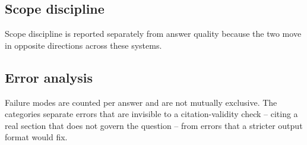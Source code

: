 \documentclass[11pt,a4paper]{article}
\begin{document}
\subsection{Scope discipline}
Scope discipline is reported separately from answer quality because the two move in opposite directions across these systems.
\begin{table}[htbp]
\centering
\renewcommand{\arraystretch}{1.15}
\caption{Scope discipline. The out-of-scope probe set contains 20 questions from other domains (income tax, VAT, criminal law, immigration, foreign labour law, medicine, programming, general knowledge); the desired behaviour is to decline. The in-scope column is the over-refusal rate on the hold-out set, where declining is a failure.}
\label{tab:refusal}
\small
{}
\end{table}

\subsection{Error analysis}
Failure modes are counted per answer and are not mutually exclusive. The categories separate errors that are invisible to a citation-validity check -- citing a real section that does not govern the question -- from errors that a stricter output format would fix.
\begin{table}[htbp]
\centering
\renewcommand{\arraystretch}{1.15}
\caption{Failure modes on the hold-out set (counts). Categories are not mutually exclusive: one answer can both cite a section that does not exist in the Act and omit a required condition.}
\label{tab:errors}
\small
{}
\end{table}
\end{document}
